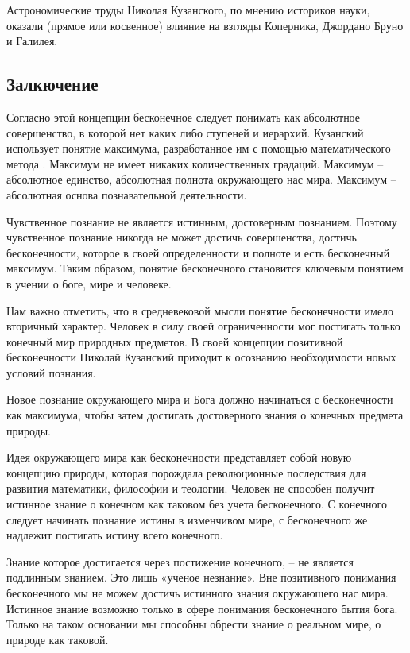 \documentclass[
]{article}
\begin{document}
Астрономические труды Николая Кузанского, по мнению историков науки,
оказали (прямое или косвенное) влияние на взгляды Коперника, Джордано
Бруно и Галилея.

\hypertarget{ux437ux430ux43bux43aux44eux447ux435ux43dux438ux435}{%
\subsection{Залкючение}\label{ux437ux430ux43bux43aux44eux447ux435ux43dux438ux435}}

Согласно этой концепции бесконечное следует понимать как абсолютное
совершенство, в которой нет каких либо ступеней и иерархий. Кузанский
использует понятие максимума, разработанное им с помощью математического
метода . Максимум не имеет никаких количественных градаций. Максимум --
абсолютное единство, абсолютная полнота окружающего нас мира. Максимум
-- абсолютная основа познавательной деятельности.

Чувственное познание не является истинным, достоверным познанием.
Поэтому чувственное познание никогда не может достичь совершенства,
достичь бесконечности, которое в своей определенности и полноте и есть
бесконечный максимум. Таким образом, понятие бесконечного становится
ключевым понятием в учении о боге, мире и человеке.

Нам важно отметить, что в средневековой мысли понятие бесконечности
имело вторичный характер. Человек в силу своей ограниченности мог
постигать только конечный мир природных предметов. В своей концепции
позитивной бесконечности Николай Кузанский приходит к осознанию
необходимости новых условий познания.

Новое познание окружающего мира и Бога должно начинаться с бесконечности
как максимума, чтобы затем достигать достоверного знания о конечных
предмета природы.

Идея окружающего мира как бесконечности представляет собой новую
концепцию природы, которая порождала революционные последствия для
развития математики, философии и теологии. Человек не способен получит
истинное знание о конечном как таковом без учета бесконечного. С
конечного следует начинать познание истины в изменчивом мире, с
бесконечного же надлежит постигать истину всего конечного.

Знание которое достигается через постижение конечного, -- не является
подлинным знанием. Это лишь «ученое незнание». Вне позитивного понимания
бесконечного мы не можем достичь истинного знания окружающего нас мира.
Истинное знание возможно только в сфере понимания бесконечного бытия
бога. Только на таком основании мы способны обрести знание о реальном
мире, о природе как таковой.
\end{document}
